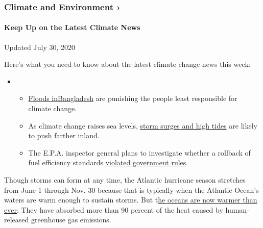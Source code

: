 \hypertarget{climate-and-environment-}{%
\subsubsection{Climate and Environment
›}\label{climate-and-environment-}}

\hypertarget{keep-up-on-the-latest-climate-news}{%
\paragraph{Keep Up on the Latest Climate
News}\label{keep-up-on-the-latest-climate-news}}

Updated July 30, 2020

Here's what you need to know about the latest climate change news this
week:

\begin{itemize}
\item
  \begin{itemize}
  \tightlist
  \item
    \href{https://www.nytimes.com/2020/07/30/climate/bangladesh-floods.html?action=click\&pgtype=Article\&state=default\&region=MAIN_CONTENT_1\&context=storylines_keepup}{Floods
    in}\href{https://www.nytimes.com/2020/07/30/climate/bangladesh-floods.html?action=click\&pgtype=Article\&state=default\&region=MAIN_CONTENT_1\&context=storylines_keepup}{Bangladesh}
    are punishing the people least responsible for climate change.
  \item
    As climate change raises sea levels,
    \href{https://www.nytimes.com/2020/07/30/climate/sea-level-inland-floods.html?action=click\&pgtype=Article\&state=default\&region=MAIN_CONTENT_1\&context=storylines_keepup}{storm
    surges and high tides} are likely to push farther inland.
  \item
    The E.P.A. inspector general plans to investigate whether a rollback
    of fuel efficiency standards
    \href{https://www.nytimes.com/2020/07/27/climate/trump-fuel-efficiency-rule.html?action=click\&pgtype=Article\&state=default\&region=MAIN_CONTENT_1\&context=storylines_keepup}{violated
    government rules}.
  \end{itemize}
\end{itemize}

Though storms can form at any time, the Atlantic hurricane season
stretches from June 1 through Nov. 30 because that is typically when the
Atlantic Ocean's waters are warm enough to sustain storms. But
t\href{https://www.nytimes.com/2019/01/10/climate/ocean-warming-climate-change.html}{he
oceans are now warmer than ever}: They have absorbed more than 90
percent of the heat caused by human-released greenhouse gas emissions.

